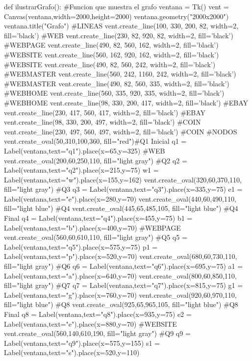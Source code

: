 \documentclass{article}
\begin{document}
\begin{python}
		def ilustrarGrafo(): #Funcion que muestra el grafo
			ventana = Tk()
			vent = Canvas(ventana,width=2000,height=2000)
			ventana.geometry("2000x2000")
			ventana.title("Grafo")
			#LINEAS    
			vent.create_line(100, 330, 200, 82, width=2, fill='black') #WEB
			vent.create_line(230, 82, 920, 82, width=2, fill='black') #WEBPAGE
			vent.create_line(490, 82, 560, 162, width=2, fill='black') #WEBSITE
			vent.create_line(560, 162, 920, 162, width=2, fill='black') #WEBSITE
			vent.create_line(490, 82, 560, 242, width=2, fill='black') #WEBMASTER
			vent.create_line(560, 242, 1160, 242, width=2, fill='black') #WEBMASTER
			vent.create_line(490, 82, 560, 335, width=2, fill='black') #WEBHOME
			vent.create_line(560, 335, 920, 335, width=2, fill='black') #WEBHOME 
			vent.create_line(98, 330, 200, 417, width=2, fill='black') #EBAY
			vent.create_line(230, 417, 560, 417, width=2, fill='black') #EBAY
			vent.create_line(98, 330, 200, 497, width=2, fill='black') #COIN
			vent.create_line(230, 497, 560, 497, width=2, fill='black') #COIN  
			#NODOS    
			vent.create_oval(50,310,100,360, fill="red")#Q1 Inicial
			q1 = Label(ventana,text="q1").place(x=65,y=325)
			#WEB
			vent.create_oval(200,60,250,110, fill="light gray") #Q2
			q2 = Label(ventana,text="q2").place(x=215,y=75)
			w1 = Label(ventana,text="w").place(x=155,y=162)
			vent.create_oval(320,60,370,110, fill="light gray") #Q3
			q3 = Label(ventana,text="q3").place(x=335,y=75)   
			e1 = Label(ventana,text="e").place(x=280,y=70) 
			vent.create_oval(440,60,490,110, fill="light blue") #Q4
			vent.create_oval(445,65,485,105, fill="light blue") #Q4 Final
			q4 = Label(ventana,text="q4").place(x=455,y=75)   
			b1 = Label(ventana,text="b").place(x=400,y=70) 
			#WEBPAGE
			vent.create_oval(560,60,610,110, fill="light gray") #Q5
			q5 = Label(ventana,text="q5").place(x=575,y=75)
			p1 = Label(ventana,text="p").place(x=520,y=70)
			vent.create_oval(680,60,730,110, fill="light gray") #Q6
			q6 = Label(ventana,text="q6").place(x=695,y=75)
			a1 = Label(ventana,text="a").place(x=640,y=70)
			vent.create_oval(800,60,850,110, fill="light gray") #Q7
			q7 = Label(ventana,text="q7").place(x=815,y=75)
			g1 = Label(ventana,text="g").place(x=760,y=70)
			vent.create_oval(920,60,970,110, fill="light blue") #Q8 
			vent.create_oval(925,65,965,105, fill="light blue") #Q8 Final
			q8 = Label(ventana,text="q8").place(x=935,y=75)
			e2 = Label(ventana,text="e").place(x=880,y=70)    
			#WEBSITE
			vent.create_oval(560,140,610,190, fill="light gray") #Q9
			q9 = Label(ventana,text="q9").place(x=575,y=155)
			s1 = Label(ventana,text="s").place(x=520,y=110)

\end{python}
\end{document}
